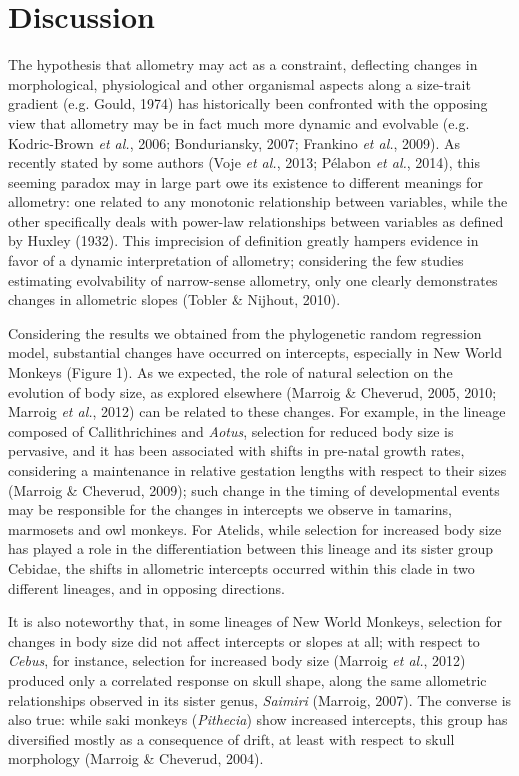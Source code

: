 \documentclass[12pt,twoside]{report}
\begin{document}
\section{Discussion}\label{discussion-1}

The hypothesis that allometry may act as a constraint, deflecting
changes in morphological, physiological and other organismal aspects
along a size-trait gradient (e.g. Gould, 1974) has historically been
confronted with the opposing view that allometry may be in fact much
more dynamic and evolvable (e.g. Kodric-Brown \emph{et al.}, 2006;
Bonduriansky, 2007; Frankino \emph{et al.}, 2009). As recently stated by
some authors (Voje \emph{et al.}, 2013; Pélabon \emph{et al.}, 2014),
this seeming paradox may in large part owe its existence to different
meanings for allometry: one related to any monotonic relationship
between variables, while the other specifically deals with power-law
relationships between variables as defined by Huxley (1932). This
imprecision of definition greatly hampers evidence in favor of a dynamic
interpretation of allometry; considering the few studies estimating
evolvability of narrow-sense allometry, only one clearly demonstrates
changes in allometric slopes (Tobler \& Nijhout, 2010).

Considering the results we obtained from the phylogenetic random
regression model, substantial changes have occurred on intercepts,
especially in New World Monkeys (Figure 1). As we expected, the role of
natural selection on the evolution of body size, as explored elsewhere
(Marroig \& Cheverud, 2005, 2010; Marroig \emph{et al.}, 2012) can be
related to these changes. For example, in the lineage composed of
Callithrichines and \emph{Aotus}, selection for reduced body size is
pervasive, and it has been associated with shifts in pre-natal growth
rates, considering a maintenance in relative gestation lengths with
respect to their sizes (Marroig \& Cheverud, 2009); such change in the
timing of developmental events may be responsible for the changes in
intercepts we observe in tamarins, marmosets and owl monkeys. For
Atelids, while selection for increased body size has played a role in
the differentiation between this lineage and its sister group Cebidae,
the shifts in allometric intercepts occurred within this clade in two
different lineages, and in opposing directions.

It is also noteworthy that, in some lineages of New World Monkeys,
selection for changes in body size did not affect intercepts or slopes
at all; with respect to \emph{Cebus}, for instance, selection for
increased body size (Marroig \emph{et al.}, 2012) produced only a
correlated response on skull shape, along the same allometric
relationships observed in its sister genus, \emph{Saimiri} (Marroig,
2007). The converse is also true: while saki monkeys (\emph{Pithecia})
show increased intercepts, this group has diversified mostly as a
consequence of drift, at least with respect to skull morphology (Marroig
\& Cheverud, 2004).
\end{document}
